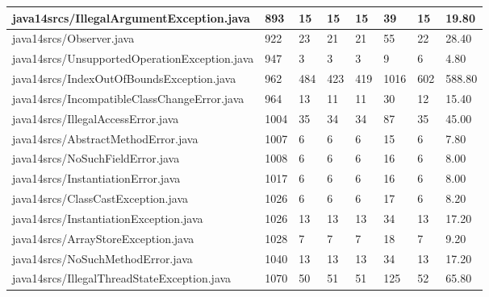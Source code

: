 \begin{tabular}{|l|l|l|l|l|l|l|l|}
\hline
java14srcs/IllegalArgumentException.java           & 893         & 15        & 15        & 15        & 39        & 15        & 19.80     \\
\hline
java14srcs/Observer.java                           & 922         & 23        & 21        & 21        & 55        & 22        & 28.40     \\
\hline
java14srcs/UnsupportedOperationException.java      & 947         & 3         & 3         & 3         & 9         & 6         & 4.80      \\
\hline
java14srcs/IndexOutOfBoundsException.java          & 962         & 484       & 423       & 419       & 1016      & 602       & 588.80    \\
\hline
java14srcs/IncompatibleClassChangeError.java       & 964         & 13        & 11        & 11        & 30        & 12        & 15.40     \\
\hline
java14srcs/IllegalAccessError.java                 & 1004        & 35        & 34        & 34        & 87        & 35        & 45.00     \\
\hline
java14srcs/AbstractMethodError.java                & 1007        & 6         & 6         & 6         & 15        & 6         & 7.80      \\
\hline
java14srcs/NoSuchFieldError.java                   & 1008        & 6         & 6         & 6         & 16        & 6         & 8.00      \\
\hline
java14srcs/InstantiationError.java                 & 1017        & 6         & 6         & 6         & 16        & 6         & 8.00      \\
\hline
java14srcs/ClassCastException.java                 & 1026        & 6         & 6         & 6         & 17        & 6         & 8.20      \\
\hline
java14srcs/InstantiationException.java             & 1026        & 13        & 13        & 13        & 34        & 13        & 17.20     \\
\hline
java14srcs/ArrayStoreException.java                & 1028        & 7         & 7         & 7         & 18        & 7         & 9.20      \\
\hline
java14srcs/NoSuchMethodError.java                  & 1040        & 13        & 13        & 13        & 34        & 13        & 17.20     \\
\hline
java14srcs/IllegalThreadStateException.java        & 1070        & 50        & 51        & 51        & 125       & 52        & 65.80     \\

\end{tabular}
